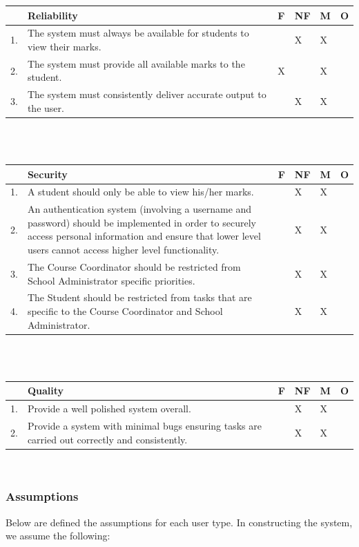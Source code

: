 \documentclass[paper=a4, fontsize=11pt]{scrartcl}
\numberwithin{equation}{section}		%
\numberwithin{figure}{section}			%
\numberwithin{table}{section}				%
\begin{document}
\begin{tabular}{|p{1cm}|p{9.5cm}|p{0.5cm}|p{0.5cm}|p{0.5cm}|p{0.5cm}|}
\hline  & \textbf{Reliability} & F & NF & M & O \\ 
\hline 1. & The system must always be available for students to view their marks. &  & X & X &  \\ 
\hline 2. & The system must provide all available marks to the student.  & X &  & X &  \\ 
\hline 3. & The system must consistently deliver accurate output to the user.  &  & X & X &  \\ 
\hline 
\end{tabular} 
\\\\

\begin{tabular}{|p{1cm}|p{9.5cm}|p{0.5cm}|p{0.5cm}|p{0.5cm}|p{0.5cm}|}
\hline  & \textbf{Security} & F & NF & M & O \\ 
\hline 1. & A student should only be able to view his/her marks. &  & X & X &  \\ 
\hline 2. & An authentication system (involving a username and password) should be implemented in order to securely access personal information and ensure that lower level users cannot access higher level functionality.   &  & X & X &  \\ 
\hline 3. &The Course Coordinator should be restricted from School Administrator specific priorities.  &  & X & X &  \\ 
\hline 4. & The Student should be restricted from tasks that are specific to the Course Coordinator and School Administrator. & & X & X & \\
\hline 
\end{tabular} 
\\\\

\begin{tabular}{|p{1cm}|p{9.5cm}|p{0.5cm}|p{0.5cm}|p{0.5cm}|p{0.5cm}|}
\hline  & \textbf{Quality} & F & NF & M & O \\ 
\hline 1. & Provide a well polished system overall. &  & X & X &  \\ 
\hline 2. &  Provide a system with minimal bugs ensuring tasks are carried out correctly and consistently.  &  & X & X &  \\
\hline 
\end{tabular} 
\\


\subsubsection{Assumptions}
Below are defined the assumptions for each user type. In constructing the system, we assume the following: 
\end{document}
